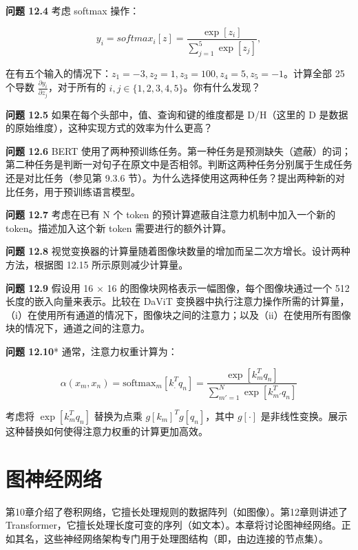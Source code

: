 \documentclass[lang=cn,newtx,10pt,scheme=chinese]{elegantbook}
\begin{document}
\textbf{问题 12.4} 考虑 softmax 操作：

\begin{equation}
y_i = softmax_i[z] = \frac{\exp[z_i]}{\sum_{j=1}^{5} \exp[z_j]}, 
\end{equation}

在有五个输入的情况下：\(z_1 = -3, z_2 = 1, z_3 = 100, z_4 = 5, z_5 = -1\)。计算全部 25 个导数 \(\frac{\partial y_i}{\partial z_j}\)，对于所有的 \(i,j \in \{1,2,3,4,5\}\)。你有什么发现？

\textbf{问题 12.5} 如果在每个头部中，值、查询和键的维度都是 D/H（这里的 D 是数据的原始维度），这种实现方式的效率为什么更高？

\textbf{问题 12.6} BERT 使用了两种预训练任务。第一种任务是预测缺失（遮蔽）的词；第二种任务是判断一对句子在原文中是否相邻。判断这两种任务分别属于生成任务还是对比任务（参见第 9.3.6 节）。为什么选择使用这两种任务？提出两种新的对比任务，用于预训练语言模型。

\textbf{问题 12.7} 考虑在已有 N 个 token 的预计算遮蔽自注意力机制中加入一个新的 token。描述加入这个新 token 需要进行的额外计算。

\textbf{问题 12.8} 视觉变换器的计算量随着图像块数量的增加而呈二次方增长。设计两种方法，根据图 12.15 所示原则减少计算量。

\textbf{问题 12.9} 假设用 16 × 16 的图像块网格表示一幅图像，每个图像块通过一个 512 长度的嵌入向量来表示。比较在 DaViT 变换器中执行注意力操作所需的计算量，（i）在使用所有通道的情况下，图像块之间的注意力；以及（ii）在使用所有图像块的情况下，通道之间的注意力。

\textbf{问题 12.10}* 通常，注意力权重计算为：

\begin{equation}
\alpha(x_m, x_n) = \text{softmax}_m [k_.^T q_n] = \frac{\exp[k_m^T q_n]}{\sum_{m'=1}^N \exp[k_{m'}^T q_n]} 
\end{equation}


考虑将 \(\exp \left[ k_m^T q_n \right]\) 替换为点乘 \(g[k_m]^T g[q_n]\)，其中 \(g[\cdot]\) 是非线性变换。展示这种替换如何使得注意力权重的计算更加高效。

\chapter{图神经网络}

第10章介绍了卷积网络，它擅长处理规则的数据阵列（如图像）。第12章则讲述了 Transformer，它擅长处理长度可变的序列（如文本）。本章将讨论图神经网络。正如其名，这些神经网络架构专门用于处理图结构（即，由边连接的节点集）。
\end{document}
